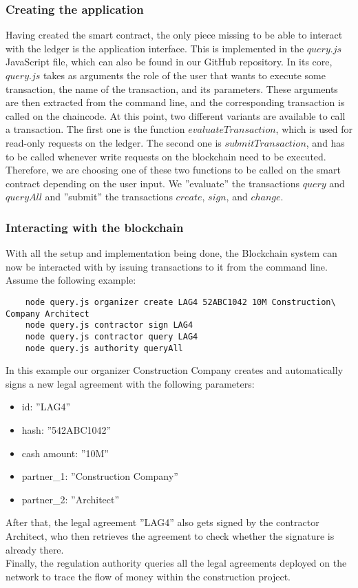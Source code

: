 \subsubsection{Creating the application} \label{application}
Having created the smart contract, the only piece missing to be able to interact with the ledger is the application interface. This is implemented in the $ query.js $ JavaScript file, which can also be found in our GitHub repository. 
In its core, $ query.js $ takes as arguments the role of the user that wants to execute some transaction, the name of the transaction, and its parameters. These arguments are then extracted from the command line, and the corresponding transaction is called on the chaincode. At this point, two different variants are available to call a transaction. The first one is the function $ evaluateTransaction $, which is used for read-only requests on the ledger. The second one is $ submitTransaction $, and has to be called whenever write requests on the blockchain need to be executed. Therefore, we are choosing one of these two functions to be called on the smart contract depending on the user input. We ''evaluate'' the transactions $ query $ and $ queryAll $ and ''submit'' the transactions $ create $, $ sign $, and $ change $. 

\subsubsection{Interacting with the blockchain}
With all the setup and implementation being done, the Blockchain system can now be interacted with by issuing transactions to it from the command line. 
Assume the following example: 

\begin{verbatim}
	node query.js organizer create LAG4 52ABC1042 10M Construction\ Company Architect
	node query.js contractor sign LAG4
	node query.js contractor query LAG4
	node query.js authority queryAll
\end{verbatim}
In this example our organizer Construction Company creates and automatically signs a new legal agreement with the following parameters:
\begin{itemize}
	\item id: ''LAG4''
	\item hash: ''542ABC1042''
	\item cash amount: ''10M''
	\item partner\_1: ''Construction Company''
	\item partner\_2: ''Architect''
\end{itemize}	
After that, the legal agreement ''LAG4'' also gets signed by the contractor Architect, who then retrieves the agreement to check whether the signature is already there. \\
Finally, the regulation authority queries all the legal agreements deployed on the network to trace the flow of money within the construction project. 
	
